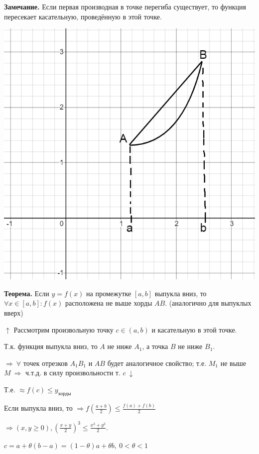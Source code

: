\documentclass{article}
\begin{document}
\textbf{Замечание.} Если первая производная в точке перегиба существует, то функция пересекает касательную, проведённую в этой точке.

\includegraphics[scale=0.3]{11_1_11_7.png}

\textbf{Теорема.} Если \( y = f(x) \) на промежутке \( [a, b] \) выпукла вниз, то \( \forall x \in [a, b]: f(x) \) расположена не выше хорды \(AB\). (аналогично для выпуклых вверх)

\(\uparrow\) Рассмотрим произвольную точку \(c \in (a,b)\) и касательную в этой точке.

Т.к. функция выпукла вниз, то \(A\) не ниже \(A_1\), а точка \(B\) не ниже \(B_1\).

\(\Rightarrow\ \forall\) точек отрезков \(A_1B_1\) и \(AB\) будет аналогичное свойство; т.е. \(M_1\) не выше \(M\ \Rightarrow\) ч.т.д. в силу произвольности т. \(c\ \downarrow\)

Т.е. \(\approx f(c) \leq y_{\textrm{хорды}}\)

Если выпукла вниз, то \(\Rightarrow f(\frac{a+b}{2}) \leq \frac{f(a)+f(b)}{2}\)

\(\Rightarrow (x, y \geq 0), (\frac{x+y}{2})^3 \leq \frac{x^3 + y^3}{2}\).

\(c = a +\theta(b - a) = (1 - \theta)a + \theta b,\ 0 < \theta < 1\)
\end{document}

